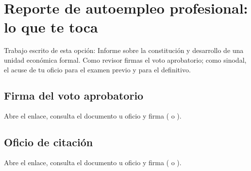 \section{Reporte de autoempleo profesional: lo que te toca}
Trabajo escrito de esta opción: Informe sobre la constitución y desarrollo de una unidad económica formal. Como revisor firmas el voto aprobatorio; como sinodal, el acuse de tu oficio para el examen previo y para el definitivo.
\subsection{Firma del voto aprobatorio}
Abre el enlace, consulta el documento u oficio y firma ( o ).
\subsection{Oficio de citación}
Abre el enlace, consulta el documento u oficio y firma ( o ).
